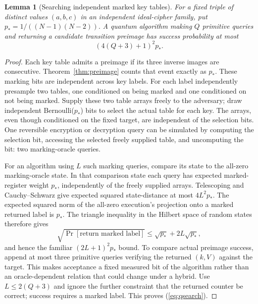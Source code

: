 \documentclass[11 pt,a 4 paper]{article}
\newtheorem{lemma}[theorem]{Lemma}
\begin{document}
\begin{lemma}[Searching independent marked key tables]\label{lem:qsearch}
For a fixed triple of distinct values $(a,b,c)$ in an independent ideal-cipher family, put $ p_*=1/((N-1)(N-2))$. A quantum algorithm making $ Q $ primitive queries and returning a candidate transition preimage has success probability at most
\begin{equation}
 (4(Q+3)+1)^2 p_* .\label{eq:qsearch}
\end{equation}
\end{lemma}
\begin{proof}
Each key table admits a preimage if its three inverse images are consecutive. Theorem~\ref{thm:preimage} counts that event exactly as $ p_*$. These marking bits are independent across key labels. For each label independently presample two tables, one conditioned on being marked and one conditioned on not being marked. Supply these two table arrays freely to the adversary; draw independent Bernoulli($ p_*$) bits to select the actual table for each key. The arrays, even though conditioned on the fixed target, are independent of the selection bits. One reversible encryption or decryption query can be simulated by computing the selection bit, accessing the selected freely supplied table, and uncomputing the bit: two marking-oracle queries.

For an algorithm using $ L $ such marking queries, compare its state to the all-zero marking-oracle state. In that comparison state each query has expected marked-register weight $ p_*$, independently of the freely supplied arrays. Telescoping and Cauchy--Schwarz give expected squared state-distance at most $4 L^2 p_*$. The expected squared norm of the all-zero execution's projection onto a marked returned label is $ p_*$. The triangle inequality in the Hilbert space of random states therefore gives
\[
 \sqrt{\Pr[\text{return marked label}]}\leq\sqrt{p_*}+2 L\sqrt{p_*},
\]
and hence the familiar $(2 L+1)^2 p_*$ bound. To compare actual preimage success, append at most three primitive queries verifying the returned $(k,V)$ against the target. This makes acceptance a fixed measured bit of the algorithm rather than an oracle-dependent relation that could change under a hybrid. Use $ L\leq 2(Q+3)$ and ignore the further constraint that the returned counter be correct; success requires a marked label. This proves (\ref{eq:qsearch}).
\end{proof}
\end{document}
